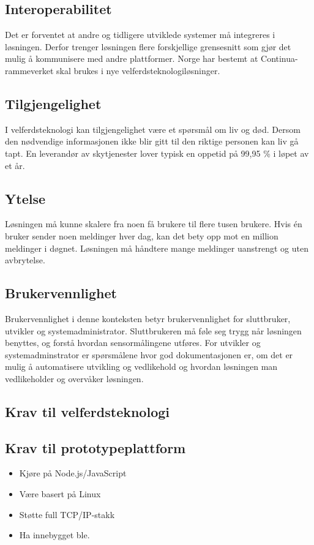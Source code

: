 \subsection{Interoperabilitet}
Det er forventet at andre og tidligere utviklede systemer må integreres i løsningen. Derfor trenger løsningen flere forskjellige
grensesnitt som gjør det mulig å kommunisere med andre plattformer. Norge har bestemt at Continua-rammeverket skal brukes i nye
velferdsteknologiløsninger.

\subsection{Tilgjengelighet}
I velferdsteknologi kan tilgjengelighet være et spørsmål om liv og død. Dersom den nødvendige informasjonen ikke blir gitt til den
riktige personen kan liv gå tapt. En leverandør av skytjenester lover typisk en oppetid på 99,95 \% i løpet av et år.

\subsection{Ytelse}
Løsningen må kunne skalere fra noen få brukere til flere tusen brukere. Hvis én bruker sender noen meldinger hver dag, kan det
bety opp mot en million meldinger i døgnet. Løsningen må håndtere mange meldinger uanstrengt og uten avbrytelse.

\subsection{Brukervennlighet}
Brukervennlighet i denne konteksten betyr brukervennlighet for sluttbruker, utvikler og systemadministrator.
Sluttbrukeren må føle seg trygg når løsningen benyttes, og forstå hvordan sensormålingene utføres.
For utvikler og systemadminstrator er spørsmålene hvor god dokumentasjonen er, om det er mulig å automatisere
utvikling og vedlikehold og hvordan løsningen man vedlikeholder og overvåker løsningen.

\subsection{Krav til velferdsteknologi}
\subsection{Krav til prototypeplattform}

\begin{itemize}
    \item Kjøre på Node.js/JavaScript
    \item Være basert på Linux
    \item Støtte full TCP/IP-stakk
    \item Ha innebygget \gls{ble}.
\end{itemize}



